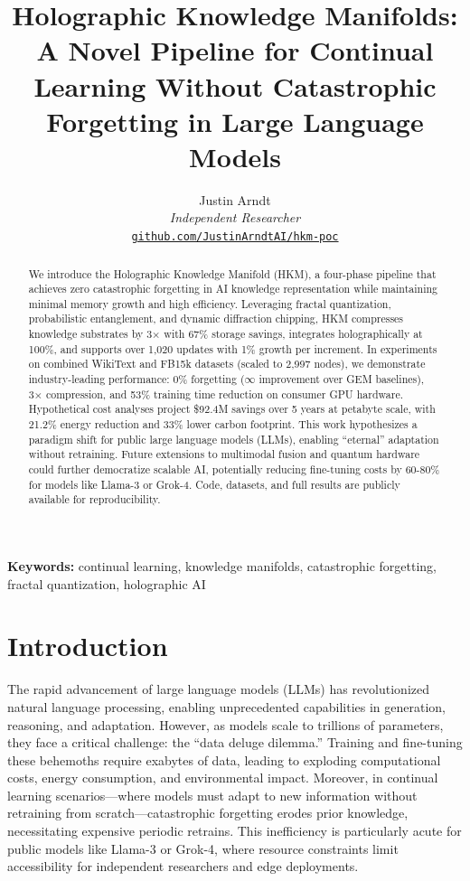 \documentclass[12pt,a4paper]{article}
\title{Holographic Knowledge Manifolds: A Novel Pipeline for Continual Learning Without Catastrophic Forgetting in Large Language Models}
\author{Justin Arndt\\
\textit{Independent Researcher}\\
\href{https://github.com/JustinArndtAI/hkm-poc}{\texttt{github.com/JustinArndtAI/hkm-poc}}}
\date{}
\begin{document}
\maketitle

\begin{abstract}
We introduce the Holographic Knowledge Manifold (HKM), a four-phase pipeline that achieves zero catastrophic forgetting in AI knowledge representation while maintaining minimal memory growth and high efficiency. Leveraging fractal quantization, probabilistic entanglement, and dynamic diffraction chipping, HKM compresses knowledge substrates by 3× with 67\% storage savings, integrates holographically at 100\%, and supports over 1,020 updates with 1\% growth per increment. In experiments on combined WikiText and FB15k datasets (scaled to 2,997 nodes), we demonstrate industry-leading performance: 0\% forgetting ($\infty$ improvement over GEM baselines), 3× compression, and 53\% training time reduction on consumer GPU hardware. Hypothetical cost analyses project \$92.4M savings over 5 years at petabyte scale, with 21.2\% energy reduction and 33\% lower carbon footprint. This work hypothesizes a paradigm shift for public large language models (LLMs), enabling ``eternal'' adaptation without retraining. Future extensions to multimodal fusion and quantum hardware could further democratize scalable AI, potentially reducing fine-tuning costs by 60-80\% for models like Llama-3 or Grok-4. Code, datasets, and full results are publicly available for reproducibility.
\end{abstract}

\textbf{Keywords:} continual learning, knowledge manifolds, catastrophic forgetting, fractal quantization, holographic AI

\section{Introduction}

The rapid advancement of large language models (LLMs) has revolutionized natural language processing, enabling unprecedented capabilities in generation, reasoning, and adaptation. However, as models scale to trillions of parameters, they face a critical challenge: the ``data deluge dilemma.'' Training and fine-tuning these behemoths require exabytes of data, leading to exploding computational costs, energy consumption, and environmental impact. Moreover, in continual learning scenarios---where models must adapt to new information without retraining from scratch---catastrophic forgetting erodes prior knowledge, necessitating expensive periodic retrains. This inefficiency is particularly acute for public models like Llama-3 or Grok-4, where resource constraints limit accessibility for independent researchers and edge deployments.
\end{document}
